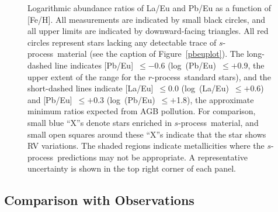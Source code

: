 \documentclass{emulateapj}
\def\rpro{\mbox{$r$-process}}
\def\spro{\mbox{$s$-process}}
\begin{document}
\begin{figure}
\begin{center}
\end{center}
\caption{
\label{simmererplot}
Logarithmic abundance ratios of La/Eu and Pb/Eu as a function of [Fe/H].
All measurements are indicated by small black circles,
and all upper limits are indicated by downward-facing triangles.
All red circles represent stars lacking any detectable
trace of \spro\ material (see the caption of Figure~\ref{pbeuplot}).
The long-dashed line indicates [Pb/Eu]~$\leq -0.6$ (log~(Pb/Eu)~$\leq +0.9$,
the upper extent of the range for the \rpro\ standard stars),
and the short-dashed lines indicate 
[La/Eu]~$\leq 0.0$
(log~(La/Eu)~$\leq +$0.6) and
[Pb/Eu]~$\leq +0.3$
(log~(Pb/Eu)~$\leq +$1.8),
the approximate minimum ratios expected from AGB pollution.
For comparison, 
small blue ``X''s denote stars enriched in \spro\ material,
and small open squares around these ``X''s indicate that
the star shows RV variations.
The shaded regions indicate metallicities where the
\spro\ predictions may not be appropriate.
A representative uncertainty is shown 
in the top right corner of each panel.
}
\end{figure}


\subsection{Comparison with Observations}
\end{document}
